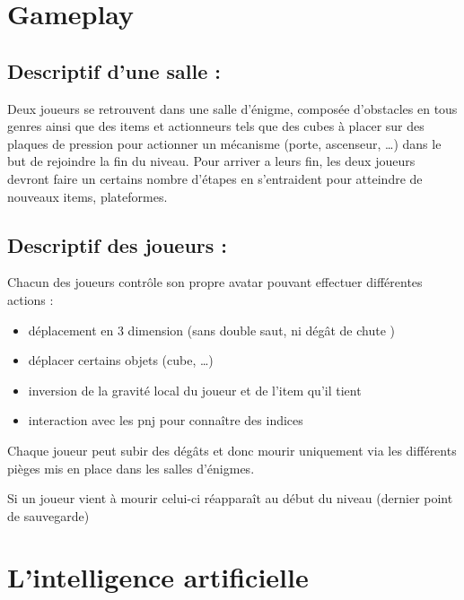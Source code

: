 \documentclass[a4paper,11pt]{article}
\begin{document}
\section{Gameplay}

\subsection{Descriptif d’une salle :} 

Deux joueurs se retrouvent dans une salle d'énigme, 
composée d’obstacles en tous genres ainsi que des items et actionneurs tels que des cubes 
à placer sur des plaques de pression pour actionner un mécanisme (porte, ascenseur, …) dans 
le but de rejoindre la fin du niveau. Pour arriver a leurs fin, les deux joueurs devront faire 
un certains nombre d’étapes en s’entraident pour atteindre de nouveaux items, plateformes.

\newpage

\subsection{Descriptif des joueurs :} 

Chacun des joueurs contrôle son propre avatar pouvant effectuer différentes actions : 
\newline

\begin{itemize}
    \item déplacement en 3 dimension (sans double saut, ni dégât de chute )
    \item déplacer certains objets (cube, …)
    \item inversion de la gravité local du joueur et de l’item qu’il tient
    \item interaction avec les pnj pour connaître des indices \newline
\end{itemize}



Chaque joueur peut subir des dégâts et donc mourir uniquement via les différents pièges
 mis en place dans les salles d'énigmes.

Si un joueur vient à mourir celui-ci réapparaît au début du niveau (dernier point de sauvegarde) 

\section{L’intelligence artificielle}
\end{document}
